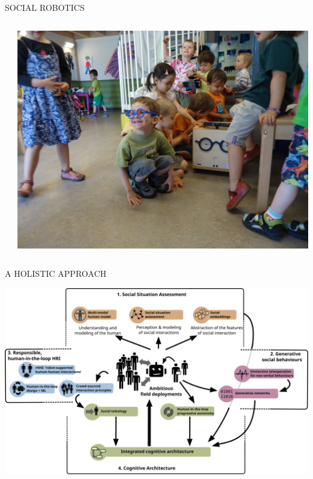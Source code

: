 \documentclass[xcolor=table]{beamer}
\begin{document}
\begin{frame}{SOCIAL ROBOTICS}
\begin{columns}
\begin{column}{0.7\linewidth}
{            }
        \end{column}
        \begin{column}{0.3\linewidth}
            \begin{center}
                \includegraphics[trim=15cm 0 11cm 0,clip,width=\linewidth]{ranger/ranger_funny_glasses}
            \end{center}
        \end{column}
    \end{columns}


\end{frame}

\begin{frame}{A HOLISTIC APPROACH}
    \begin{center}
        \includegraphics[width=\linewidth]{architectures/wps}
    \end{center}
\end{frame}
\end{document}
